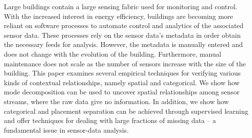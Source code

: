 

Large buildings contain a large sensing fabric used for monitoring and control.
With the increased interest in energy efficiency, buildings are becoming more reliant on software processes
to automate control and analytics of the associated sensor data.  These processes rely on the sensor data's
metadata in order obtain the necessary feeds for analysis.  However, the metadata is manually entered and 
does not change with the evolution of the building.  Furthermore, manual maintenance does not scale as the number
of sensors increase with the size of the building.  %
This paper examines several empirical techniques for verifying various
kinds of contextual relationships, namely spatial and categorical.  We show how mode decomposition
can be used to uncover spatial relationships among sensor streams, where the raw data give no information.
In addition, we show how categorical and placement  
separation can be achieved through supervised learning and offer techniques for dealing with 
large fractions of missing data -- a fundamental issue in sensor-data analysis.